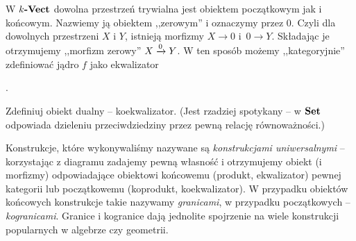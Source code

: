 \begin{remk}[\starred]
    W $\Vect k$ dowolna przestrzeń trywialna jest obiektem początkowym jak i końcowym. Nazwiemy ją obiektem ,,zerowym'' i oznaczymy przez $0$.
    Czyli dla dowolnych przestrzeni $X$ i $Y$, istnieją morfizmy $X\to 0$ i~$0\to Y$. Składając je otrzymujemy ,,morfizm zerowy'' $\morpharr 0 X Y$.
    W ten sposób możemy ,,kategoryjnie'' zdefiniować jądro $f$ jako ekwalizator .
\end{remk}

\begin{exc}
  Zdefiniuj obiekt dualny -- koekwalizator. (Jest rzadziej spotykany -- w $\Set$ odpowiada dzieleniu przeciwdziedziny przez pewną relację równoważności.)
\end{exc}

%

\begin{remk}
  Konstrukcje, które wykonywaliśmy nazywane są \emph{konstrukcjami uniwersalnymi} -- korzystając z diagramu zadajemy pewną własność i otrzymujemy obiekt (i morfizmy) odpowiadające obiektowi końcowemu (produkt, ekwalizator) pewnej kategorii lub początkowemu (koprodukt, koekwalizator). W przypadku obiektów końcowych konstrukcje takie nazywamy \emph{granicami}, w przypadku początkowych -- \emph{kogranicami}.
  Granice i kogranice dają jednolite spojrzenie na wiele konstrukcji popularnych w algebrze czy geometrii.
\end{remk}
